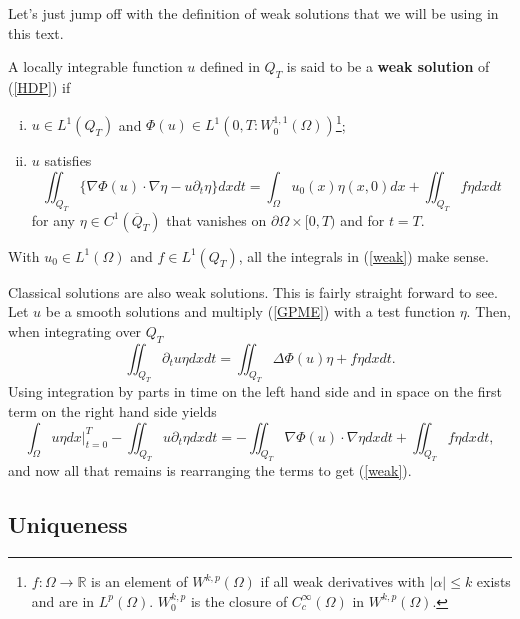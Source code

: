 \documentclass[11pt, a4paper]{article}
\begin{document}
Let's just jump off with the definition of weak solutions that we will be using in this text.
\begin{mydef}
A locally integrable function $u$ defined in $Q_T$ is said to be a \textbf{weak solution} of (\ref{HDP}) if
\begin{enumerate}[i)]
	\item $u \in L^1(Q_T)$ and $\Phi(u) \in L^1(0,T : W_0^{1,1}(\Omega))$\footnote{$f:\Omega \to \mathbb{R}$ is an element of $W^{k,p}(\Omega)$ if all weak derivatives with $|\alpha| \leq k$ exists and are in $L^p(\Omega)$. $W_0^{k,p}$ is the closure of $C^\infty_c(\Omega)$ in $W^{k,p}(\Omega)$.};
	\item $u$ satisfies
		\begin{equation}
		\label{weak}
		\iint_{Q_T} \{\nabla\Phi(u)\cdot \nabla\eta - u\partial_t \eta \}dxdt = \int_\Omega u_0(x)\eta(x,0)dx + \iint_{Q_T}f\eta dxdt
		\end{equation}
for any $\eta \in C^1(\overline{Q}_T)$ that vanishes on $\partial \Omega \times [0,T)$ and for $t=T$.
\end{enumerate}
\end{mydef}

\setcounter{obs}{0}
\begin{obs}
With $u_0 \in L^1(\Omega)$ and $f\in L^1(Q_T)$, all the integrals in (\ref{weak}) make sense.
\end{obs}
\begin{obs}
Classical solutions are also weak solutions. This is fairly straight forward to see. Let $u$ be a smooth solutions and multiply (\ref{GPME}) with a test function $\eta$. Then, when integrating over $Q_T$
\begin{equation*}
\iint_{Q_T}\partial_t u \eta dxdt = \iint_{Q_T}\Delta\Phi(u) \eta + f\eta dxdt.
\end{equation*}
Using integration by parts in time on the left hand side and in space on the first term on the right hand side yields
\begin{equation*}
\int_\Omega u\eta dx \Bigg|_{t=0}^T - \iint_{Q_T}u\partial_t \eta dxdt = -\iint_{Q_T}\nabla \Phi(u) \cdot \nabla \eta dxdt + \iint_{Q_T}f\eta dxdt,
\end{equation*}
and now all that remains is rearranging the terms to get (\ref{weak}).
\end{obs}

\subsection{Uniqueness}
\end{document}
